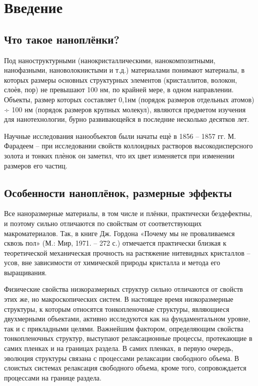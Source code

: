 \documentclass[14pt]{extarticle}
\begin{document}
\tableofcontents




\section{Введение}

\subsection{Что такое наноплёнки?}

Под наноструктурными (нанокристаллическими, нанокомпозитными, нанофазными, нановолокнистыми и т.д.) материалами понимают материалы, в которых размеры основных структурных элементов (кристаллитов, волокон, слоѐв, пор) не превышают 100 нм, по крайней мере, в одном направлении. Объекты, размер которых составляет 0,1нм (порядок размеров отдельных атомов) ÷ 100 нм (порядок размеров крупных молекул), являются предметом изучения для нанотехнологии, бурно развивающейся в последние несколько десятков лет.

Научные исследования нанообъектов были начаты ещѐ в 1856 – 1857 гг. М. Фарадеем – при исследовании свойств коллоидных растворов высокодисперсного золота и тонких плѐнок он заметил, что их цвет изменяется при изменении размеров его частиц.










\subsection{Особенности наноплёнок, размерные эффекты}

Все наноразмерные материалы, в том числе и плёнки, практически бездефектны, и поэтому сильно отличаются по свойствам от соответствующих макроматериалов. Так, в книге Дж. Гордона «Почему мы не проваливаемся сквозь пол» (М.: Мир, 1971. – 272 с.) отмечается практически близкая к теоретической механическая прочность на растяжение нитевидных кристаллов – усов, вне зависимости от химической природы кристалла и метода его выращивания.

Физические свойства низкоразмерных структур сильно отличаются от свойств этих же, но макроскопических систем. В настоящее время низкоразмерные структуры, к которым относятся тонкопленочные структуры, являющиеся двухмерными объектами, активно исследуются как на фундаментальном уровне, так и с прикладными целями. Важнейшим фактором, определяющим свойства тонкопленочных структур, выступают релаксационные процессы, протекающие в самих пленках и на границах раздела. В самих пленках, в первую очередь, эволюция структуры связана с процессами релаксации свободного объема. В слоистых системах релаксация свободного объема, кроме того, сопровождается процессами на границе раздела.
\end{document}
